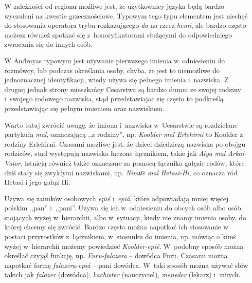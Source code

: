 \begin{spacing}{1.1}
W zależności od regionu możliwe jest, że użytkownicy języka będą bardzo
wyczuleni na kwestie grzecznościowe. Typowym tego typu elementem jest niechęć do
stosowania operatora trybu rozkazującego \emph{do} na rzecz \emph{hemi}, ale
bardzo często możesz również spotkać się z~honoryfikatorami służącymi do
odpowiedniego zwracania się do innych osób.

W And́royas typowym jest używanie pierwszego imienia w~odniesieniu do rozmówcy,
lub podczas określania osoby, chyba, że jest to niemożliwe do jednoznacznej
identyfikacji, wtedy używa się pełnego imienia i~nazwiska. Z drugiej jednak
strony mieszkańcy Cesarstwa są bardzo dumni ze swojej rodziny i~swojego rodowego
nazwiska, stąd przedstawiajac się często to podkreślą przedstawiając się pełnym
imieniem oraz nazwiskiem.


Warto tutaj zwrócić uwagę, że imiona i~nazwiska w~Cesarstwie są rozdzielane
partykułą \emph{mal}, oznaczającą ,,z rodziny'', np. \emph{Koolder mal
Erlehirni} to Koolder z rodziny Erlehirni. Czasami możliwe jest, że dzieci
dziedziczą nazwiska po obojgu rodziców, stąd występują nazwiska łączone
łącznikiem, takie jak \emph{Alya mal Arkai-Valor}. Istnieją również także
oznaczane za pomocą łącznika gałęzie rodów, które dziś stały się zwykłymi
nazwiskami, np. \emph{Nimu͞e mal Hetasi-Hi}, co oznacza ród Hetasi i jego gałąź
Hi.

\skipline

Używa się zaimków osobowych \emph{epié} i~\emph{epiá}, które odpowiadają mniej
więcej polskim ,,pan'' i~,,pani''. Używa się ich w~odniesieniu do obcych osób
albo osób stojących wyżej w~hierarchii, albo w~sytuacji, kiedy nie znamy imienia
osoby, do której chcemy się zwrócić. Bardzo często można napotkać ich stosowanie
w postaci przyrostków z~łącznikiem, w~stosunku do imienia, np. mówiąc o kimś
wyżej w~hierarchii możemy powiedzieć \emph{Koolder-epié}. W~podobny sposób
można określać czyjąś funkcję, np. \emph{Furu-falazera} -- dowódca Furu. Czasami
można napotkać formę \emph{falazera-epiá} -- pani dowódca. W~taki sposób można
używać słów takich jak \emph{falazer} (dowódca), \emph{kachister} (nauczyciel),
\emph{meneder} (lekarz) i~innych.


\end{spacing}
